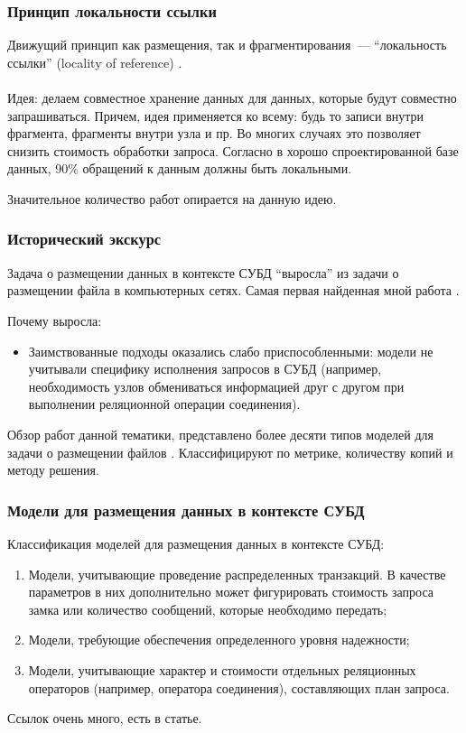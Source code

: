 \documentclass[unicode]{beamer}
\begin{document}
\begin{frame}

\frametitle{Принцип локальности ссылки}

\begin{block}{}

Движущий принцип как размещения, так и фрагментирования~--- ``локальность ссылки'' (locality of reference) \cite{p8}.
\\~\\
Идея: делаем совместное хранение данных для данных, которые будут совместно запрашиваться. Причем, идея применяется ко всему: будь то записи внутри фрагмента, фрагменты внутри узла и пр. Во многих случаях это позволяет снизить стоимость обработки запроса. Согласно \cite{p32} в хорошо спроектированной базе данных, 90\% обращений к данным должны быть локальными. 
\end{block}

Значительное количество работ опирается на данную идею.

\end{frame}

\begin{frame}
\frametitle{Исторический экскурс}

Задача о размещении данных в контексте СУБД ``выросла'' из задачи о размещении файла в компьютерных сетях. Самая первая найденная мной работа \cite{p2}.

Почему выросла:
\begin{itemize}
  \item Заимствованные подходы оказались слабо приспособленными: модели не учитывали специфику исполнения запросов в СУБД (например, необходимость узлов обмениваться информацией друг с другом при выполнении реляционной операции соединения).
\end{itemize}
  
Обзор работ данной тематики, представлено более десяти типов моделей для задачи о размещении файлов \cite{p33}. Классифицируют по метрике, количеству копий и методу решения.
\end{frame}

\begin{frame}
\frametitle{Модели для размещения данных в контексте СУБД}

Классификация моделей для размещения данных в контексте СУБД:
\begin{enumerate}
  \setlength\itemsep{1em}		
  \item Модели, учитывающие проведение распределенных транзакций. В качестве параметров в них дополнительно может фигурировать стоимость запроса замка или количество сообщений, которые необходимо передать;
  \item Модели, требующие обеспечения определенного уровня надежности;
  \item Модели, учитывающие характер и стоимости отдельных реляционных операторов (например, оператора соединения), составляющих план запроса.
\end{enumerate}

Ссылок очень много, есть в статье.

\end{frame}
\end{document}
